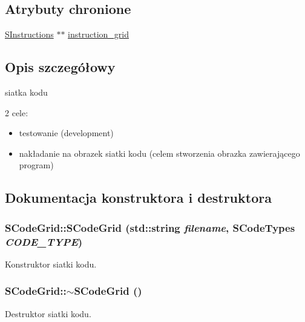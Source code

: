 \subsection*{Atrybuty chronione}
\begin{CompactItemize}
\item 
\hyperlink{senums_8h_b1c3fa9dccd3f8afa81e14a98d9a7d1e}{SInstructions} $\ast$$\ast$ \hyperlink{classSCodeGrid_445b4bd8cca6ddb7100afa621f5722b0}{instruction\_\-grid}
\end{CompactItemize}


\subsection{Opis szczegółowy}
siatka kodu 

2 cele:

\begin{itemize}
\item testowanie (development)\item nakładanie na obrazek siatki kodu (celem stworzenia obrazka zawierającego program) \end{itemize}


\subsection{Dokumentacja konstruktora i destruktora}
\hypertarget{classSCodeGrid_e430762ac9855cd60f8d5a57c46428b9}{
\subsubsection[{SCodeGrid}]{\setlength{\rightskip}{0pt plus 5cm}SCodeGrid::SCodeGrid (std::string {\em filename}, \/  {\bf SCodeTypes} {\em CODE\_\-TYPE})}}
\label{classSCodeGrid_e430762ac9855cd60f8d5a57c46428b9}


Konstruktor siatki kodu. \hypertarget{classSCodeGrid_c150afdd8f27785b5ddf5669a4d90332}{
\subsubsection[{$\sim$SCodeGrid}]{\setlength{\rightskip}{0pt plus 5cm}SCodeGrid::$\sim$SCodeGrid ()}}
\label{classSCodeGrid_c150afdd8f27785b5ddf5669a4d90332}


Destruktor siatki kodu. 

